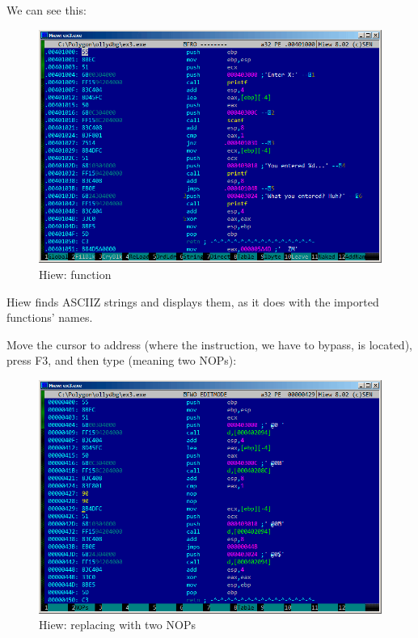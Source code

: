 We can see this:

\begin{figure}[H]
\centering
\includegraphics[scale=\FigScale]{patterns/04_scanf/3_checking_retval/hiew_1.png}
\caption{Hiew: \main function}
\label{fig:scanf_ex3_hiew_1}
\end{figure}

Hiew finds \ac{ASCIIZ} strings and displays them, as it does with the imported functions' names.

\clearpage
Move the cursor to address  (where the  instruction, we have to bypass, is located), press F3, and then type  (meaning two \ac{NOP}s):

\begin{figure}[H]
\centering
\includegraphics[scale=\FigScale]{patterns/04_scanf/3_checking_retval/hiew_2.png}
\caption{Hiew: replacing  with two \ac{NOP}s}
\label{fig:scanf_ex3_hiew_2}
\end{figure}

